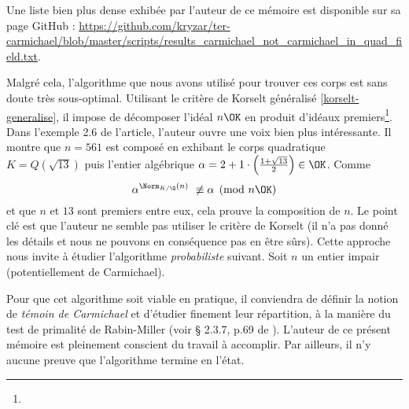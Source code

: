 \begin{Complement}
	Une liste bien plus dense exhibée par l'auteur de ce mémoire est disponible sur sa page GitHub : \url{https://github.com/kryzar/ter-carmichael/blob/master/scripts/results_carmichael_not_carmichael_in_quad_field.txt}. \\
\end{Complement}

Malgré cela, l'algorithme que nous avons utilisé pour trouver ces corps est sans doute très sous-optimal. Utilisant le critère de Korselt généralisé \ref{korselt-generalise}, il impose de décomposer l'idéal $n\OK$ en produit d'idéaux premiers\footnote{}. Dans l'exemple 2.6 de l'article, l'auteur ouvre une voix bien plus intéressante. Il montre que $n = 561$ est composé en exhibant le corps quadratique $K = Q(\sqrt{13})$ puis l'entier algébrique $\alpha = 2 + 1\cdot \left(\frac{1 + \sqrt{13}}{2}\right) \in \OK$. Comme $$\alpha^{\Norm_{K/\Q}(n)} \not \equiv \alpha \pmod{n\OK}$$ et que $n$ et $13$ sont premiers entre eux, cela prouve la composition de $n$. Le point clé est que l'auteur ne semble pas utiliser le critère de Korselt (il n'a pas donné les détails et nous ne pouvons en conséquence pas en être sûrs). Cette approche nous invite à étudier l'algorithme \emph{probabiliste} suivant. Soit $n$ un entier impair (potentiellement de Carmichael).

\vspace{1em}
\begin{algorithm}[H]\label{algo-quadratique-faible}
\end{algorithm}
\vspace{1em}

Pour que cet algorithme soit viable en pratique, il conviendra de définir la notion de \textit{témoin de Carmichael} et d'étudier finement leur répartition, à la manière du test de primalité de Rabin-Miller (voir § 2.3.7, p.69 de \cite{Demazure}). L'auteur de ce présent mémoire est pleinement conscient du travail à accomplir. Par ailleurs, il n'y aucune preuve que l'algorithme termine en l'état. \\

